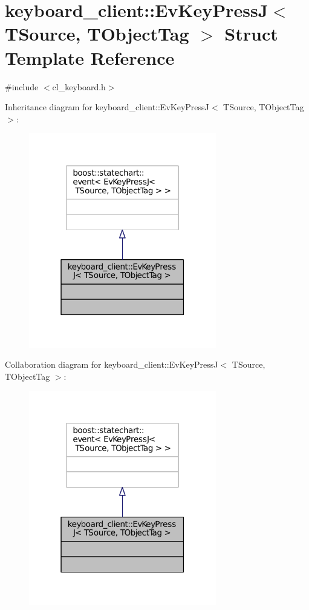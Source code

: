 \hypertarget{structkeyboard__client_1_1EvKeyPressJ}{}\section{keyboard\+\_\+client\+:\+:Ev\+Key\+PressJ$<$ T\+Source, T\+Object\+Tag $>$ Struct Template Reference}
\label{structkeyboard__client_1_1EvKeyPressJ}


{\ttfamily \#include $<$cl\+\_\+keyboard.\+h$>$}



Inheritance diagram for keyboard\+\_\+client\+:\+:Ev\+Key\+PressJ$<$ T\+Source, T\+Object\+Tag $>$\+:
\nopagebreak
\begin{figure}[H]
\begin{center}
\leavevmode
\includegraphics[width=232pt]{structkeyboard__client_1_1EvKeyPressJ__inherit__graph}
\end{center}
\end{figure}


Collaboration diagram for keyboard\+\_\+client\+:\+:Ev\+Key\+PressJ$<$ T\+Source, T\+Object\+Tag $>$\+:
\nopagebreak
\begin{figure}[H]
\begin{center}
\leavevmode
\includegraphics[width=232pt]{structkeyboard__client_1_1EvKeyPressJ__coll__graph}
\end{center}
\end{figure}



